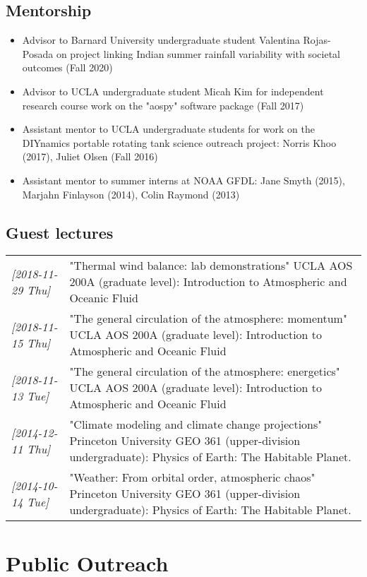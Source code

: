 \documentclass[12pt,letterpaper]{shillcv}
\begin{document}
\subsection*{Mentorship}
\label{sec:org92fdb5c}
\begin{itemize}
\item Advisor to Barnard University undergraduate student Valentina Rojas-Posada on
project linking Indian summer rainfall variability with societal outcomes
(Fall 2020)
\item Advisor to UCLA undergraduate student Micah Kim for independent research
course work on the "aospy" software package (Fall 2017)
\item Assistant mentor to UCLA undergraduate students for work on the DIYnamics
portable rotating tank science outreach project: Norris Khoo (2017), Juliet
Olsen (Fall 2016)
\item Assistant mentor to summer interns at NOAA GFDL: Jane Smyth (2015), Marjahn
Finlayson (2014), Colin Raymond (2013)
\end{itemize}
\subsection*{Guest lectures}
\label{sec:org07ac869}
\begin{center}
\begin{tabularx}{\textwidth}{lX}
\textit{[2018-11-29 Thu]} & "Thermal wind balance: lab demonstrations"  UCLA AOS 200A (graduate level): Introduction to Atmospheric and Oceanic Fluid\\
\textit{[2018-11-15 Thu]} & "The general circulation of the atmosphere: momentum"  UCLA AOS 200A (graduate level): Introduction to Atmospheric and Oceanic Fluid\\
\textit{[2018-11-13 Tue]} & "The general circulation of the atmosphere: energetics"  UCLA AOS 200A (graduate level): Introduction to Atmospheric and Oceanic Fluid\\
\textit{[2014-12-11 Thu]} & "Climate modeling and climate change projections"  Princeton University GEO 361 (upper-division undergraduate):  Physics of Earth: The Habitable Planet.\\
\textit{[2014-10-14 Tue]} & "Weather: From orbital order, atmospheric chaos"  Princeton University GEO 361 (upper-division undergraduate):  Physics of Earth: The Habitable Planet.\\
\end{tabularx}
\end{center}
\section*{Public Outreach}
\label{sec:orgb748a6e}
\end{document}

